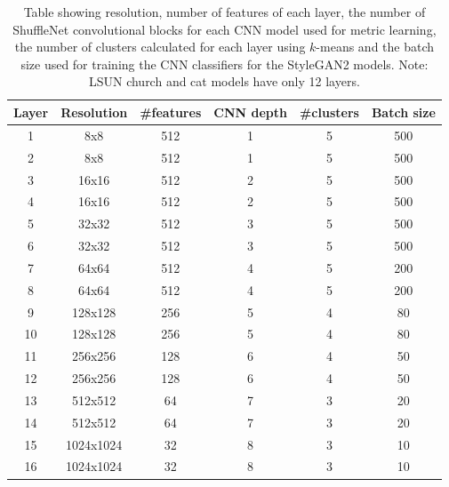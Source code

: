 \begin{table}[]
\centering
\begin{tabular}{|c|c|c|c|c|c|}%
\hline
Layer & Resolution & \#features &  CNN depth & \#clusters & Batch size\\
\hline
1     & 8x8        & 512          & 1                & 5                & 500        \\
2     & 8x8        & 512          & 1                & 5                & 500        \\
3     & 16x16      & 512          & 2                & 5                & 500        \\
4     & 16x16      & 512          & 2                & 5                & 500        \\
5     & 32x32      & 512          & 3                & 5                & 500        \\
6     & 32x32      & 512          & 3                & 5                & 500        \\
7     & 64x64      & 512          & 4                & 5                & 200        \\
8     & 64x64      & 512          & 4                & 5                & 200         \\
9     & 128x128    & 256          & 5                & 4                & 80         \\
10    & 128x128    & 256          & 5                & 4                & 80         \\
11    & 256x256    & 128          & 6                & 4                & 50         \\
12    & 256x256    & 128          & 6                & 4                & 50         \\
13    & 512x512    & 64           & 7                & 3                & 20         \\
14    & 512x512    & 64           & 7                & 3                & 20         \\
15    & 1024x1024  & 32           & 8                & 3                & 10         \\
16    & 1024x1024  & 32           & 8                & 3                & 10       \\
\hline
\end{tabular}
\medskip
\caption[Table detailing model architecture for the ShuffleNet models used for clustering in StyleGAN2.]{
    \label{tab:classifier-table}Table showing resolution, number of features of each layer, the number of ShuffleNet \citep{zhang2018shufflenet} convolutional blocks for each CNN model used for metric learning, the number of clusters calculated for each layer using $k$-means and the batch size used for training the CNN classifiers for the StyleGAN2 models. Note: LSUN church and cat models have only 12 layers.
}
\end{table}


